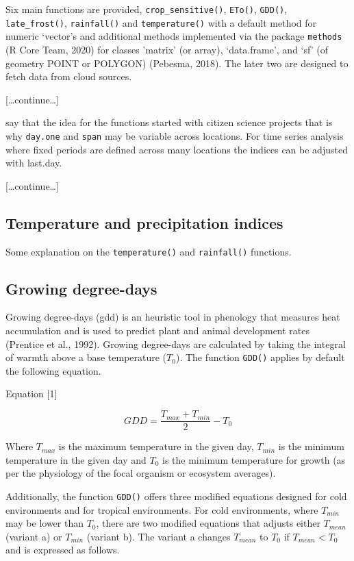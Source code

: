 \documentclass[
]{article}
\begin{document}
Six main functions are provided, \texttt{crop\_sensitive()},
\texttt{ETo()}, \texttt{GDD()}, \texttt{late\_frost()},
\texttt{rainfall()} and \texttt{temperature()} with a default method for
numeric `vector's and additional methods implemented via the package
\texttt{methods} (R Core Team, 2020) for classes 'matrix' (or array),
`data.frame', and `sf' (of geometry POINT or POLYGON) (Pebesma, 2018).
The later two are designed to fetch data from cloud sources.

{[}\ldots continue\ldots{]}

say that the idea for the functions started with citizen science
projects that is why \texttt{day.one} and \texttt{span} may be variable
across locations. For time series analysis where fixed periods are
defined across many locations the indices can be adjusted with last.day.

{[}\ldots continue\ldots{]}

\hypertarget{temperature-and-precipitation-indices}{%
\subsection{Temperature and precipitation
indices}\label{temperature-and-precipitation-indices}}

Some explanation on the \texttt{temperature()} and \texttt{rainfall()}
functions.

\hypertarget{growing-degree-days}{%
\subsection{Growing degree-days}\label{growing-degree-days}}

Growing degree-days (gdd) is an heuristic tool in phenology that
measures heat accumulation and is used to predict plant and animal
development rates (Prentice et al., 1992). Growing degree-days are
calculated by taking the integral of warmth above a base temperature
(\(T_{0}\)). The function \texttt{GDD()} applies by default the
following equation.

Equation {[}1{]}

\[GDD = \frac{T_{max} + T_{min}}{2} - T_{0}\]

Where \(T_{max}\) is the maximum temperature in the given day,
\(T_{min}\) is the minimum temperature in the given day and \(T_{0}\) is
the minimum temperature for growth (as per the physiology of the focal
organism or ecosystem averages).

Additionally, the function \texttt{GDD()} offers three modified
equations designed for cold environments and for tropical environments.
For cold environments, where \(T_{min}\) may be lower than \(T_{0}\),
there are two modified equations that adjusts either \(T_{mean}\)
(variant a) or \(T_{min}\) (variant b). The variant a changes
\(T_{mean}\) to \(T_{0}\) if \(T_{mean} < T_{0}\) and is expressed as
follows.
\end{document}
